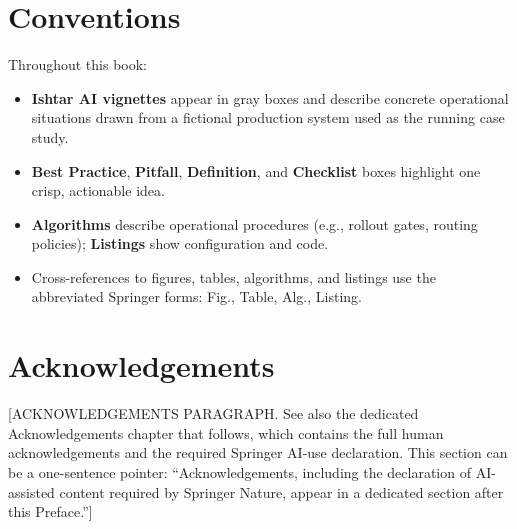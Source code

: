 \section*{Conventions}

Throughout this book:

\begin{itemize}
  \item \textbf{Ishtar AI vignettes} appear in gray boxes and describe
        concrete operational situations drawn from a fictional
        production system used as the running case study.
  \item \textbf{Best Practice}, \textbf{Pitfall}, \textbf{Definition},
        and \textbf{Checklist} boxes highlight one crisp,
        actionable idea.
  \item \textbf{Algorithms} describe operational procedures (e.g.,
        rollout gates, routing policies); \textbf{Listings} show
        configuration and code.
  \item Cross-references to figures, tables, algorithms, and listings
        use the abbreviated Springer forms: Fig., Table, Alg.,
        Listing.
\end{itemize}

\section*{Acknowledgements}

[ACKNOWLEDGEMENTS PARAGRAPH. See also the dedicated Acknowledgements
chapter that follows, which contains the full human acknowledgements
and the required Springer AI-use declaration. This section can be a
one-sentence pointer: ``Acknowledgements, including the declaration
of AI-assisted content required by Springer Nature, appear in a
dedicated section after this Preface.'']
